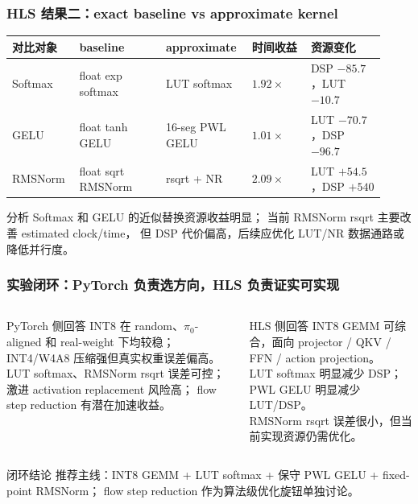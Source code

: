 \documentclass[10pt, aspectratio=169]{beamer}
\begin{document}
\begin{frame}
  \frametitle{HLS 结果二：exact baseline vs approximate kernel}
  \scriptsize
  \begin{table}
    \setlength{\tabcolsep}{2pt}
    \begin{tabular}{@{}p{0.16\linewidth}p{0.22\linewidth}p{0.20\linewidth}p{0.15\linewidth}p{0.19\linewidth}@{}}
      \toprule
      对比对象 & baseline & approximate & 时间收益 & 资源变化 \\
      \midrule
      Softmax & float exp softmax & LUT softmax & $1.92\times$ & DSP $-85.7$，LUT $-10.7$ \\
      GELU & float tanh GELU & 16-seg PWL GELU & $1.01\times$ & LUT $-70.7$，DSP $-96.7$ \\
      RMSNorm & float sqrt RMSNorm & rsqrt + NR & $2.09\times$ & LUT $+54.5$，DSP $+540$ \\
      \bottomrule
    \end{tabular}
  \end{table}

  \begin{exampleblock}{分析}
    Softmax 和 GELU 的近似替换资源收益明显；
    当前 RMSNorm rsqrt 主要改善 estimated clock/time，
    但 DSP 代价偏高，后续应优化 LUT/NR 数据通路或降低并行度。
  \end{exampleblock}
\end{frame}

\begin{frame}
  \frametitle{实验闭环：PyTorch 负责选方向，HLS 负责证实可实现}
  \small
  \begin{columns}[T,onlytextwidth]
    \begin{block}{PyTorch 侧回答}
      \footnotesize
      INT8 在 random、$\pi_0$-aligned 和 real-weight 下均较稳；
      INT4/W4A8 压缩强但真实权重误差偏高。\\
      \vspace{2pt}
      LUT softmax、RMSNorm rsqrt 误差可控；
      激进 activation replacement 风险高；
      flow step reduction 有潜在加速收益。
    \end{block}

    \begin{alertblock}{HLS 侧回答}
      \footnotesize
      INT8 GEMM 可综合，面向 projector / QKV / FFN / action projection。\\
      \vspace{2pt}
      LUT softmax 明显减少 DSP；
      PWL GELU 明显减少 LUT/DSP。\\
      \vspace{2pt}
      RMSNorm rsqrt 误差很小，但当前实现资源仍需优化。
    \end{alertblock}
  \end{columns}

  \vspace{3pt}
  \begin{exampleblock}{闭环结论}
    推荐主线：INT8 GEMM + LUT softmax + 保守 PWL GELU + fixed-point RMSNorm；
    flow step reduction 作为算法级优化旋钮单独讨论。
  \end{exampleblock}
\end{frame}
\end{document}
